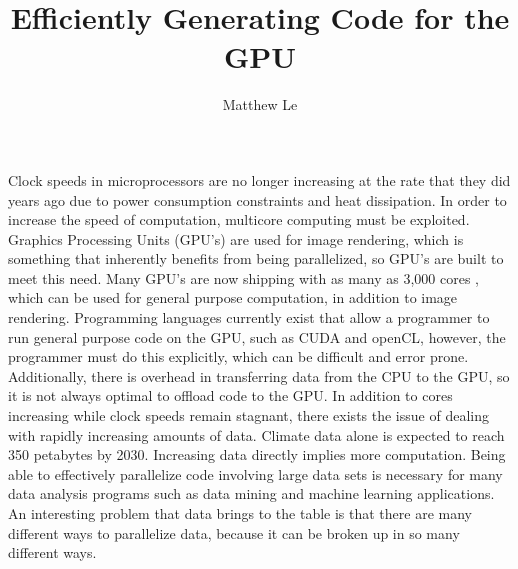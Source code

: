 \documentclass[a4paper,12pt]{article}
\title{Efficiently Generating Code for the GPU \vspace{-2ex}}
\author{Matthew Le \vspace {-1ex}}
\newcommand{\tab}{\hspace*{2em}}
\begin{document}
\maketitle

\tab Clock speeds in microprocessors are no longer increasing at the rate that they did years ago due to power consumption constraints and heat dissipation.  In order to increase the speed of computation, multicore computing must be exploited. Graphics Processing Units (GPU's) are used for image rendering, which is something that inherently benefits from being parallelized, so GPU's are built to meet this need.  Many GPU's are now shipping with as many as 3,000 cores \cite{nvideaGPU}, which can be used for general purpose computation, in addition to image rendering.  Programming languages currently exist that allow a programmer to run general purpose code on the GPU, such as CUDA and openCL, however, the programmer must do this explicitly, which can be difficult and error prone.  Additionally, there is overhead in transferring data from the CPU to the GPU, so it is not always optimal to offload code to the GPU.
\newline
\tab In addition to cores increasing while clock speeds remain stagnant, there exists the issue of dealing with rapidly increasing amounts of data.  Climate data alone is expected to reach 350 petabytes by 2030\cite{climateData}.  Increasing data directly implies more computation.  Being able to effectively parallelize code involving large data sets is necessary for many data analysis programs such as data mining and machine learning applications.  An interesting problem that data brings to the table is that there are many different ways to parallelize data, because it can be broken up in so many different ways.
\end{document}
